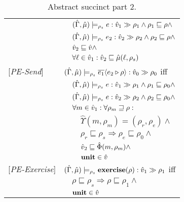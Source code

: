 \begin{table}[tlb]
\begin{tabular} {l l l l}
&&\multicolumn{2}{l}{$ (\hat{\Gamma},\hat{\mu}) \models_{\rho_s} e : \hat{v}_{1} \gg \rho_{1} \wedge \rho_1 \sqsubseteq \rho \wedge$}\\
&&\multicolumn{2}{l}{$ (\hat{\Gamma},\hat{\mu}) \models_{\rho_s} e_2 : \hat{v}_{2} \gg \rho_{2} \wedge \rho_2 \sqsubseteq \rho \wedge$}\\
&&\multicolumn{2}{l}{$\hat{v}_2 \sqsubseteq \hat{v} \wedge$}\\
&&\multicolumn{2}{l}{$\forall \ell \in \hat{v}_1: \hat{v}_2 \sqsubseteq \hat{\mu}(\ell, \rho_s)$}\\
{[\textit{PE-Send}]}&\multicolumn{3}{l}{$(\hat{\Gamma},\hat{\mu}) \models_{\rho_s} \overline{e_1} \langle e_2 \triangleright \rho \rangle : \hat{v}_{0} \gg \rho_{0} $ iff}\\
&&\multicolumn{2}{l}{$ (\hat{\Gamma},\hat{\mu}) \models_{\rho_s} e : \hat{v}_{1} \gg \rho_{1} \wedge \rho_1 \sqsubseteq \rho_0 \wedge$}\\
&&\multicolumn{2}{l}{$ (\hat{\Gamma},\hat{\mu}) \models_{\rho_s} e : \hat{v}_{2} \gg \rho_{2} \wedge \rho_2 \sqsubseteq \rho_0 \wedge$}\\
&&\multicolumn{2}{l}{$ \forall m \in \hat{v}_1 : \forall \rho_m \sqsupseteq \rho:$}\\
&&&$\hat{\Upsilon}(m, \rho_m) = (\rho_r, \rho_e)\wedge $\\
&&&$\rho_r \sqsubseteq \rho_s \Rightarrow \rho_e \sqsubseteq \rho_0 \wedge$\\
&&&$\hat{v}_2 \sqsubseteq \hat{\Phi}(m, \rho_m) \wedge $\\
&&&$\mathbf{unit} \in \hat{v} $\\
{[\textit{PE-Exercise}]}&\multicolumn{3}{l}{$(\hat{\Gamma},\hat{\mu}) \models_{\rho_s} \mathbf{exercise}(\rho) : \hat{v}_{1} \gg \rho_{1} $ iff}\\
&&\multicolumn{2}{l}{$ \rho \sqsubseteq \rho_s \Rightarrow \rho \sqsubseteq \rho_1 \wedge $}\\
&&\multicolumn{2}{l}{$ \mathbf{unit} \in \hat{v}$}\\
\end{tabular}
\caption{Abstract succinct part 2.}
\label{tab:AbstSucc2}
\end{table}

\newcommand{\all}[0]{\alpha}
